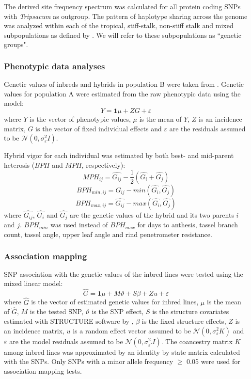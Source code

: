 \documentclass[12pt]{article}
\begin{document}
The derived site frequency spectrum was calculated for all protein coding SNPs with \emph{Tripsacum} as outgroup. 
The pattern of haplotype sharing across the genome \citep[PHS statistics;][]{Toomajian2006} was analyzed within each of the tropical, stiff-stalk, non-stiff stalk and mixed subpopulations as defined by \citet{Flint-Garcia2005}. We will refer to these subpopulations as ``genetic groups".

\subsubsection*{Phenotypic data analyses}

Genetic values %
of inbreds and hybrids in population B were taken from \citet{Flint-Garcia2009}. 
Genetic values for population A were estimated from the raw phenotypic data using the model:
%
\[Y=\mathbf{1}\mu +ZG+\varepsilon \]
%
where $Y$ is the vector of phenotypic values, $\mu$ is the mean of $Y$, $Z$ is an incidence matrix, $G$ is the vector of fixed individual effects and $\varepsilon$ are the residuals assumed to be $\mathcal{N}(0,\sigma _{\varepsilon }^{2}I)$.

Hybrid vigor for each individual was estimated by both best- and mid-parent heterosis ($BPH$ and $MPH$, respectively):
%
\[ MPH_{ij}=\hat{G_{ij}}-\frac{1}{2}(\hat{G_{i}}+\hat{G_{j}}) \]
\[ BPH_{min,ij}=\hat{G_{ij}}-min(\hat{G_{i}} ,\hat{G_{j}}) \] 
\[ BPH_{max,ij}=\hat{G_{ij}}-max(\hat{G_{i}} ,\hat{G_{j}}) \]
%
where $\hat{G_{ij}}$, $\hat{G_{i}}$ and $\hat{G_{j}}$ are the genetic values of the hybrid and its two parents $i$ and $j$. $BPH_{min}$ was used instead of $BPH_{max}$ for days to anthesis, tassel branch count, tassel angle, upper leaf angle and rind penetrometer resistance.

\subsubsection*{Association mapping}

SNP association with the genetic values of the inbred lines were tested using the mixed linear model:
%
\[\hat{G}=\mathbf{1}\mu + M\vartheta +S\beta +Zu+\varepsilon\]
%
where $\hat{G}$ is the vector of estimated genetic values for inbred lines, $\mu$ is the mean of $\hat{G}$, $M$ is the tested SNP, $\vartheta$ is the SNP effect, $S$ is the structure covariates estimated  with STRUCTURE software \citep{Pritchard2000} by \citet{Flint-Garcia2005}, $\beta$ is the fixed structure effects, $Z$ is an incidence matrix, $u$ is a random effect vector assumed to be $\mathcal{N}(0,\sigma_{ {\varepsilon}}^{2}K)$ and $\varepsilon$ are the model residuals assumed to be $\mathcal{N}(0,\sigma_{ {\varepsilon}'}^{2}I)$. 
The coancestry matrix $K$ among inbred lines was approximated by an identity by state matrix calculated with the SNPs. Only SNPs with a minor allele frequency $\ge$ 0.05 were used for association mapping tests.
\end{document}

